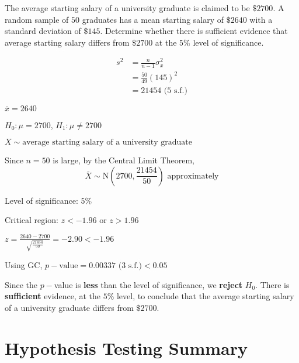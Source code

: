 \documentclass[11pt,a4paper]{book}
\begin{document}
\begin{example}

The average starting salary of a university graduate is claimed to
be $\$2700$. A random sample of $50$ graduates has a mean starting
salary of $\$2640$ with a standard deviation of $\$145$. Determine
whether there is sufficient evidence that average starting salary
differs from $\$2700$ at the $5\%$ level of significance.

\Solution

\begin{align*}
s^{2} & =\frac{n}{n-1}\sigma_{x}^{2}\\
 & =\frac{50}{49}\left(145\right)^{2}\\
 & =21454\text{ (5 s.f.)}
\end{align*}

$\overline{x}=2640$

$H_{0}:\mu=2700$, $H_{1}:\mu\neq2700$

$X\sim\text{average starting salary of a university graduate}$

Since $n=50$ is large, by the Central Limit Theorem,
\[
\overline{X}\sim\text{N}\left(2700,\frac{21454}{50}\right)\text{ approximately}
\]

Level of significance: $5\%$

Critical region: $z<-1.96$ or $z>1.96$

${\displaystyle z=\frac{2640-2700}{\sqrt{\frac{21454}{50}}}}=-2.90<-1.96$

Using GC, $p-\text{value}=0.00337\text{ (3 s.f.)}<0.05$

\begin{tcolorbox}[colback=white, colframe=black,boxrule=.4pt, sharpish corners]

Since the $p-$value is \textbf{less} than the level of significance,
we \textbf{reject} $H_{0}$. There is \textbf{sufficient} evidence,
at the $5\%$ level, to conclude that the average starting salary
of a university graduate differs from $\$2700$.
\end{tcolorbox}

\end{example}

\newpage

\section{Hypothesis Testing Summary}
\end{document}
